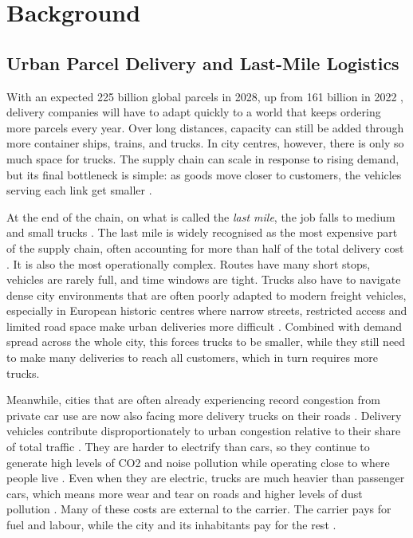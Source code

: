 \documentclass[12pt]{article}
\begin{document}
\section{Background}

\label{sec:background}

\subsection{Urban Parcel Delivery and Last-Mile Logistics}
\label{subsec:urban-parcel-delivery}

With an expected \num{225} billion global parcels in 2028, up from \num{161} billion in 2022 \parencite{pitney_bowes_index_2023}, delivery companies will have to adapt quickly to a world that keeps ordering more parcels every year. Over long distances, capacity can still be added through more container ships, trains, and trucks. In city centres, however, there is only so much space for trucks. The supply chain can scale in response to rising demand, but its final bottleneck is simple: as goods move closer to customers, the vehicles serving each link get smaller \parencite{govuk2019lastmile}.

At the end of the chain, on what is called the \textit{last mile}, the job falls to medium and small trucks \parencite{govuk2019lastmile}. The last mile is widely recognised as the most expensive part of the supply chain, often accounting for more than half of the total delivery cost \parencite{savelsbergh2016}. It is also the most operationally complex. Routes have many short stops, vehicles are rarely full, and time windows are tight. Trucks also have to navigate dense city environments that are often poorly adapted to modern freight vehicles, especially in European historic centres where narrow streets, restricted access and limited road space make urban deliveries more difficult \parencite{BACHOFNER2022100020}. Combined with demand spread across the whole city, this forces trucks to be smaller, while they still need to make many deliveries to reach all customers, which in turn requires more trucks.

Meanwhile, cities that are often already experiencing record congestion from private car use are now also facing more delivery trucks on their roads \parencite{lindsey2023distributional}. Delivery vehicles contribute disproportionately to urban congestion relative to their share of total traffic \parencite{itf2022freight}. They are harder to electrify than cars, so they continue to generate high levels of CO2 and noise pollution while operating close to where people live \parencite{COULOMBEL2018514}. Even when they are electric, trucks are much heavier than passenger cars, which means more wear and tear on roads and higher levels of dust pollution \parencite{worldbank_lutp_curriculum}. Many of these costs are external to the carrier. The carrier pays for fuel and labour, while the city and its inhabitants pay for the rest \parencite{ec_internalisation_external_costs}.
\end{document}
